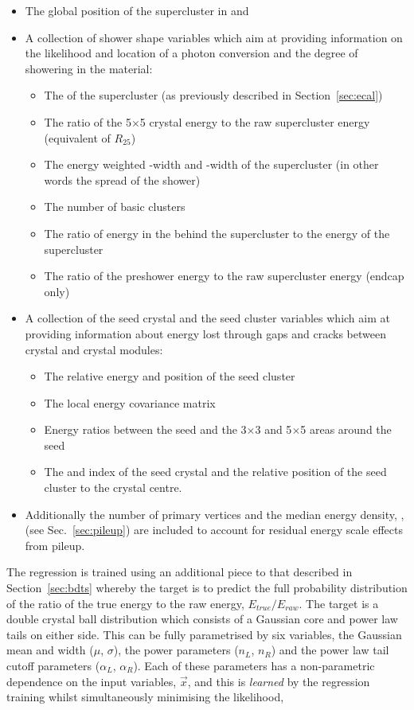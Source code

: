 \begin{itemize}
  \item The global position of the supercluster in \eta and \phi
  \item A collection of shower shape variables which aim at providing information on the likelihood and location of a photon conversion and the degree of showering in the material:
  \begin{itemize}
    \item The \rnine of the supercluster (as previously described in Section~\ref{sec:ecal})
    \item The ratio of the 5$\times$5 crystal energy to the raw supercluster energy (equivalent of $R_{25}$)
    \item The energy weighted \eta-width and \phi-width of the supercluster (in other words the spread of the shower)
    \item The number of basic clusters
    \item The ratio of energy in the \HCAL behind the supercluster to the \ECAL energy of the supercluster
    \item The ratio of the preshower energy to the raw supercluster energy (endcap only)
  \end{itemize}
  \item A collection of the seed crystal and the seed cluster variables which aim at providing information about energy lost through gaps and cracks between crystal and crystal modules:
  \begin{itemize}
    \item The relative energy and position of the seed cluster
    \item The local energy covariance matrix
    \item Energy ratios between the seed and the 3$\times$3 and 5$\times$5 areas around the seed
    \item The \eta and \phi index of the seed crystal and the relative position of the seed cluster to the crystal centre. 
  \end{itemize}
  \item Additionally the number of primary vertices and the median energy density, \rho, (see Sec.~\ref{sec:pileup}) are included to account for residual energy scale effects from pileup.
\end{itemize}

The regression is trained using an additional piece to that described in Section~\ref{sec:bdts} whereby the target is to predict the full probability distribution of the ratio of the true energy to the raw energy, $E_{true}/E_{raw}$. The target is a double crystal ball distribution which consists of a Gaussian core and power law tails on either side. This can be fully parametrised by six variables, the Gaussian mean and width ($\mu$, $\sigma$), the power parameters ($n_{L}$, $n_{R}$) and the power law tail cutoff parameters ($\alpha_{L}$, $\alpha_{R}$). Each of these parameters has a non-parametric dependence on the input variables, $\vec{x}$, and this is \emph{learned} by the regression training whilst simultaneously minimising the likelihood,

